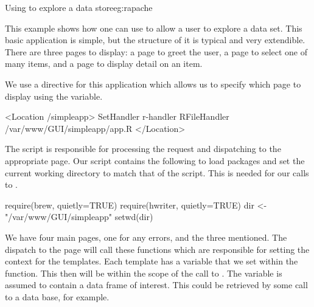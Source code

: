 \begin{example}{Using  to explore a data store}{eg:rapache}

  
  
This example shows how one can use  to allow a user to
explore a data set. This basic application is simple, but the
structure of it is typical and very extendible. There are three pages
to display: a page to greet the user, a page to select one of many
items, and a page to display detail on an item.

We use a  directive for this application which allows
us to specify which page to display using the 
variable.
\begin{HTMLinput}
<Location /simpleapp>
   SetHandler r-handler
   RFileHandler /var/www/GUI/simpleapp/app.R
</Location>
 \end{HTMLinput}
  
 The script  is responsible for processing the request and
 dispatching to the appropriate page. Our script contains the
 following to load packages and set the current working directory to
 match that of the script. This is needed for our calls to
 .
\begin{Schunk}
\begin{Sinput}
 require(brew, quietly=TRUE)
 require(hwriter, quietly=TRUE)
 dir <- "/var/www/GUI/simpleapp"
 setwd(dir)
\end{Sinput}
\end{Schunk}

We have four main pages, one for any errors, and the three
mentioned. The dispatch to the page will call these functions which
are responsible for setting the context for the 
templates. Each template has a  variable that we set
within the function. This then will be within the scope of the call to
. The variable  is assumed to contain a data frame
of interest. This could be retrieved by some call to a data base, for
example.


\end{example}
